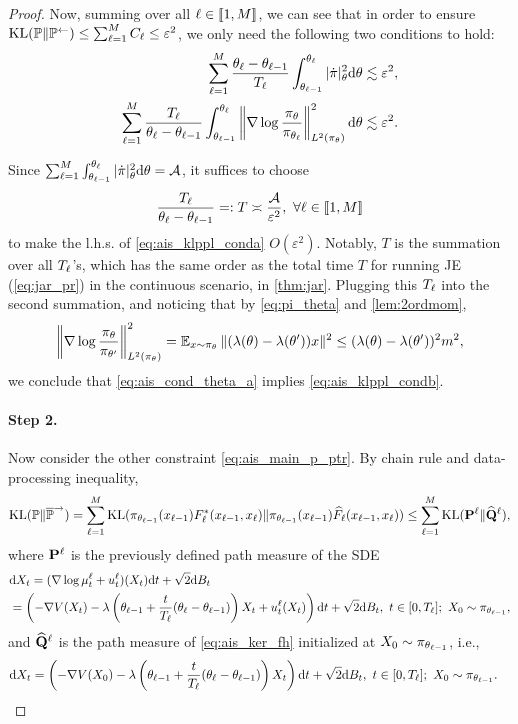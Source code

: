 \begin{proof}
    Now, summing over all $\ell\in\left[\!\left[1,M\right]\!\right]$, we can see that in order to ensure $\operatorname{KL}(\mathbb{P}\|\mathbb{P}^\gets)\le\sum_{\ell=1}^MC_\ell\le\varepsilon^2$, we only need the following two conditions to hold:
    \begin{align}
        \sum_{\ell=1}^M\frac{\theta_\ell-\theta_{\ell-1}}{T_\ell}\int_{\theta_{\ell-1}}^{\theta_\ell}|\dot\pi|_\theta^2\mathrm{d}\theta                                                  & \lesssim\varepsilon^2,\label{eq:ais_klppl_conda} \\
        \sum_{\ell=1}^M\frac{T_\ell}{\theta_\ell-\theta_{\ell-1}}\int_{\theta_{\ell-1}}^{\theta_\ell}\left\|\nabla\log\frac{\pi_\theta}{\pi_{\theta_\ell}}\right\|_{L^2(\pi_\theta)}^2\mathrm{d}\theta & \lesssim\varepsilon^2.\label{eq:ais_klppl_condb}
    \end{align}

    Since $\sum_{\ell=1}^M\int_{\theta_{\ell-1}}^{\theta_\ell}|\dot\pi|_\theta^2\mathrm{d}\theta=\mathcal{A}$, it suffices to choose
    $$\frac{T_\ell}{\theta_\ell-\theta_{\ell-1}}=:T\asymp\frac{\mathcal{A}}{\varepsilon^2},~\forall\ell\in\left[\!\left[1,M\right]\!\right]$$
    to make the l.h.s. of \cref{eq:ais_klppl_conda} $O(\varepsilon^2)$. Notably, $T$ is the summation over all $T_\ell$'s, which has the same order as the total time $T$ for running JE (\cref{eq:jar_pr}) in the continuous scenario, in \cref{thm:jar}. Plugging this $T_\ell$ into the second summation, and noticing that by \cref{eq:pi_theta} and \cref{lem:2ordmom},
    $$\left\|\nabla\log\frac{\pi_\theta}{\pi_{\theta'}}\right\|_{L^2(\pi_\theta)}^2=\operatorname{\mathbb{E}}_{x\sim\pi_\theta}{\|(\lambda(\theta)-\lambda(\theta'))x\|^2}\le(\lambda(\theta)-\lambda(\theta'))^2m^2,$$
    we conclude that \cref{eq:ais_cond_theta_a} implies \cref{eq:ais_klppl_condb}.

    \paragraph{Step 2.} Now consider the other constraint \cref{eq:ais_main_p_ptr}. By chain rule and data-processing inequality,
    $$\operatorname{KL}(\mathbb{P}\|\overline{\mathbb{P}}^\to)=\sum_{\ell=1}^{M}\operatorname{KL}(\pi_{\theta_{\ell-1}}(x_{\ell-1})F^*_\ell(x_{\ell-1},x_\ell)\|\pi_{\theta_{\ell-1}}(x_{\ell-1})\widehat{F}_\ell(x_{\ell-1},x_\ell))\le\sum_{\ell=1}^{M}\operatorname{KL}(\mathbf{P}^\ell\|{\mathbf{\widehat{Q}}}^\ell),$$
    where $\mathbf{P}^\ell$ is the previously defined path measure of the SDE
    \begin{align*}
        &\mathrm{d} X_t=(\nabla\log\mu^\ell_t+u^\ell_t)(X_t)\mathrm{d} t+\sqrt{2}\mathrm{d} B_t                                                                                                             \\
                & =\left(-\nabla V(X_t)-\lambda\left(\theta_{\ell-1}+\frac{t}{T_\ell}(\theta_\ell-\theta_{\ell-1})\right)X_t+u^\ell_t(X_t)\right)\mathrm{d} t+\sqrt{2}\mathrm{d} B_t,~t\in[0,T_\ell];~X_0\sim\pi_{\theta_{\ell-1}},
    \end{align*}
    and ${\mathbf{\widehat{Q}}}^\ell$ is the path measure of \cref{eq:ais_ker_fh} initialized at $X_0\sim\pi_{\theta_{\ell-1}}$, i.e.,
    \begin{align*}
        \mathrm{d} X_t & =\left(-\nabla V(X_0)-\lambda\left(\theta_{\ell-1}+\frac{t}{T_\ell}(\theta_\ell-\theta_{\ell-1})\right)X_t\right)\mathrm{d} t+\sqrt{2}\mathrm{d} B_t,~t\in[0,T_\ell];~X_0\sim\pi_{\theta_{\ell-1}}.
    \end{align*}


\end{proof}

